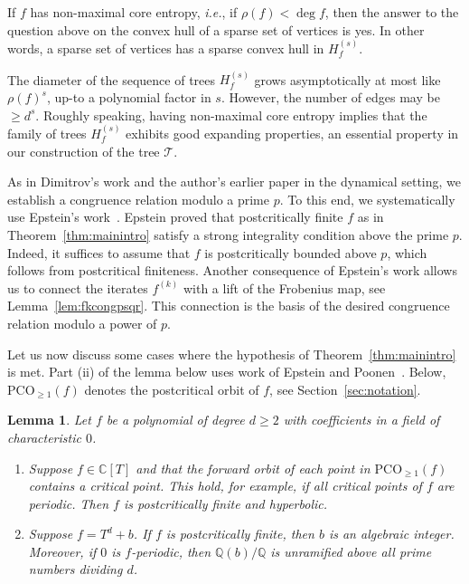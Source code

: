 \documentclass[12pt,oneside,a4]{amsart}
\newcommand{\IC}{\mathbb{C}}
\newcommand{\IQ}{\mathbb{Q}}
\newcommand{\cT}{\mathcal{T}}
\newcounter{maincounter}
\numberwithin{maincounter}{section}
\numberwithin{equation}{section}
\newtheorem{lemma}[maincounter]{Lemma}
\newcommand{\pco}{\mathrm{PCO}}
\begin{document}
If $f$ has non-maximal
core entropy, \textit{i.e.}, if $\rho(f)<\deg f$, then the answer to
the question above on the convex hull of a sparse set of vertices is yes. In other words, a sparse set of vertices
has a sparse convex hull in $H_f^{(s)}$.


The diameter of the sequence of trees $H_f^{(s)}$ grows asymptotically
at most like
$\rho(f)^s$, up-to a polynomial factor in $s$. However, the number of
edges may be $\ge d^s$. Roughly speaking, having non-maximal core
entropy implies that the family of trees $H_f^{(s)}$ exhibits good
expanding properties, an essential property in our construction of the
 tree $\cT$. 

As in Dimitrov's work and the author's earlier paper in the dynamical
setting,
we establish
a congruence relation modulo a prime $p$.
To this end, 
we systematically use Epstein's work~\cite{epstein:12}.
Epstein proved that postcritically finite $f$ as in
Theorem~\ref{thm:mainintro}
satisfy a strong
integrality condition 
 above the prime $p$. 
Indeed, it suffices to assume that $f$ is
postcritically bounded above $p$, which follows from postcritical
finiteness. Another consequence of Epstein's work allows us to connect
the iterates $f^{(k)}$ with a lift of the Frobenius
map, see Lemma~\ref{lem:fkcongpsqr}. This connection is  the basis of
the desired 
congruence relation modulo a power of $p$. 




Let us now discuss some cases where the hypothesis of
Theorem~\ref{thm:mainintro} is met. Part (ii) of the lemma below uses
work of Epstein and Poonen~\cite{epstein:12}. Below, $\pco_{\ge 1}(f)$
denotes the postcritical orbit of $f$, see
Section~\ref{sec:notation}.

\begin{lemma}
  \label{lem:critperimplieshyp}
  Let $f$ be  a polynomial of degree $d\ge 2$
  with coefficients in a field of characteristic $0$.
  \begin{enumerate}
  \item [(i)]   
    Suppose $f\in \IC[T]$ and
    that the forward orbit of each point in $\pco_{\ge 1}(f)$
    contains a critical point. This hold, for example, if all critical
    points of $f$ are periodic. Then $f$ is postcritically finite and
    hyperbolic.
  \item[(ii)] Suppose $f=T^d+b$. If $f$ is postcritically finite, then
    $b$ is an algebraic integer. Moreover, if $0$ is $f$-periodic,
    then   $\IQ(b)/\IQ$ is unramified
    above all prime numbers dividing $d$.
  \end{enumerate}
\end{lemma}
\end{document}

